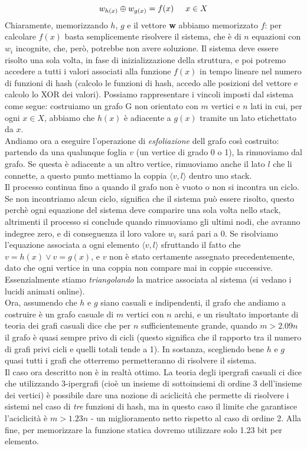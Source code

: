 \begin{equation*}
    w_{h(x)} \oplus w_{g(x)} = f(x) \hspace{5mm} x \in X
\end{equation*}
Chiaramente, memorizzando $h$, $g$ e il vettore \textbf{w} abbiamo memorizzato $f$: per calcolare $f(x)$ basta semplicemente risolvere il sistema, che è di $n$ equazioni con $w_i$ incognite, che, però, potrebbe non avere soluzione. Il sistema deve essere risolto una sola volta, in fase di inizializzazione della struttura, e poi potremo accedere a tutti i valori associati alla funzione $f(x)$ in tempo lineare nel numero di funzioni di hash (calcolo le funzioni di hash, accedo alle posizioni del vettore e calcolo lo XOR dei valori). Possiamo rappresentare i vincoli imposti dal sistema come segue: costruiamo un grafo G non orientato con $m$ vertici e $n$ lati in cui, per ogni $x \in X$, abbiamo che $h(x)$ è adiacente a $g(x)$ tramite un lato etichettato da $x$.\\
Andiamo ora a eseguire l'operazione di \textit{esfoliazione} dell grafo così costruito: partendo da una qualunque foglia $v$ (un vertice di grado 0 o 1), la rimuoviamo dal grafo. Se questa è adiacente a un altro vertice, rimuoviamo anche il lato $l$ che li connette, a questo punto mettiamo la coppia $\langle v, l \rangle$ dentro uno stack.\\
Il processo continua fino a quando il grafo non è vuoto o non si incontra un ciclo. Se non incontriamo alcun ciclo, significa che il sistema può essere risolto, questo perchè ogni equazione del sistema deve comparire una sola volta nello stack, altrimenti il processo si conclude quando rimuoviamo gli ultimi nodi, che avranno indegree zero, e di conseguenza il loro valore $w_i$ sará pari a 0. Se risolviamo l'equazione associata a ogni elemento $\langle v, l \rangle$ sfruttando il fatto che $v = h(x) \lor v = g(x)$, e $v$ non è stato certamente assegnato precedentemente, dato che ogni vertice in una coppia non compare mai in coppie successive. Essenzialmente stiamo \textit{triangolando} la matrice associata al sistema (si vedano i lucidi animati online).\\
Ora, assumendo che $h$ e $g$ siano casuali e indipendenti, il grafo che andiamo a costruire è un grafo casuale di $m$ vertici con $n$ archi, e un risultato importante di teoria dei grafi casuali dice che per $n$ sufficientemente grande, quando $m > 2.09n$ il grafo è quasi sempre privo di cicli (questo significa che il rapporto tra il numero di grafi privi cicli e quelli totali tende a 1). In sostanza, scegliendo bene $h$ e $g$ quasi tutti i grafi che otterremo permetteranno di risolvere il sistema.\\
Il caso ora descritto non è in realtà ottimo. La teoria degli ipergrafi casuali ci dice che utilizzando 3-ipergrafi (cioè un insieme di sottoinsiemi di ordine 3 dell'insieme dei vertici) è possibile dare una nozione di aciclicità che permette di risolvere i sistemi nel caso di \textit{tre} funzioni di hash, ma in questo caso il limite che garantisce l'aciclicità è $m > 1.23n$ - un miglioramento netto rispetto al caso di ordine 2.
Alla fine, per memorizzare la funzione statica  dovremo utilizzare solo 1.23 bit per elemento.

